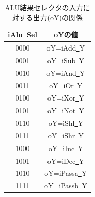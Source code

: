 \documentclass[a4paper,11pt]{ltjsarticle}
\begin{document}
\begin{table}[H]
    \centering
    \caption{ALU結果セレクタの入力に対する出力(oY)の関係}
    \label{tab:alu_sel_value}
    \begin{tabular}{|c|c|}
        \hline
        iAlu\underline{~}Sel & oYの値                    \\
        \hline
        0000                 & oY=iAdd\underline{~}Y   \\
        \hline
        0001                 & oY=iSub\underline{~}Y   \\
        \hline
        0010                 & oY=iAnd\underline{~}Y   \\
        \hline
        0011                 & oY=iOr\underline{~}Y    \\
        \hline
        0100                 & oY=iXor\underline{~}Y   \\
        \hline
        0101                 & oY=iNot\underline{~}Y   \\
        \hline
        0110                 & oY=iShl\underline{~}Y   \\
        \hline
        0111                 & oY=iShr\underline{~}Y   \\
        \hline
        1000                 & oY=iInc\underline{~}Y   \\
        \hline
        1001                 & oY=iDec\underline{~}Y   \\
        \hline
        1010                 & oY=iPassa\underline{~}Y \\
        \hline
        1111                 & oY=iPassb\underline{~}Y \\
        \hline
    \end{tabular}
\end{table}
\end{document}
